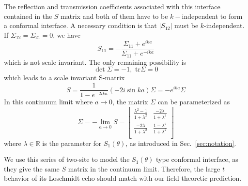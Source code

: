 The reflection and transmission coefficients associated with this interface contained in the $S$ matrix and both of them have to be $k-$independent to form a conformal interface\cite{peschel_exact_2012}. A necessary condition is that $|S_{12}|$ must be $k$-independent. If $\Sigma_{12} = \Sigma_{21} = 0 $, we have 
\begin{equation}
  S_{11} = - \frac{\Sigma_{11} + e^{ika} }{\Sigma_{11} + e^{-ika}}
\end{equation}
which is not scale invariant. The only remaining possibility is
\begin{equation}
\label{eq:Sigma_condition}
\det \Sigma = -1, \, \, \text{tr} \Sigma = 0
\end{equation}
which leads to a scale invariant S-matrix 
\begin{equation}
S = \frac{1}{1 - e^{-2ika } } ( -2i \sin ka ) \Sigma
 = - e^{ika} \Sigma
\end{equation}
In this continuum limit where $a\rightarrow0$, the matrix $\Sigma$ can be parameterized as
\begin{equation}
\Sigma = -\lim_{a \rightarrow 0 } S = 
\begin{bmatrix}
\frac{\lambda^2- 1}{1 + \lambda^2} & \frac{-2\lambda }{1 + \lambda^2} \\
\frac{-2\lambda }{1 + \lambda^2} & \frac{1- \lambda^2}{1 + \lambda^2} \\
\end{bmatrix}
\end{equation}
where $\lambda\in\mathbb{R}$ is the parameter for $S_1(\theta)$, as introduced in Sec.~\ref{sec:notation}. 

We use this series of two-site to model the $S_1(\theta)$ type conformal interface, as they give the same $S$ matrix in the continuum limit. Therefore, the large $t$ behavior of its Loschmidt echo should match with our field theoretic prediction. 

